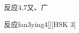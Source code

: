 \begin{entry}{反应}{4,7}{⼜、⼴}
  \begin{phonetics}{反应}{fan3ying4}[][HSK 3]
  \end{phonetics}
\end{entry}
